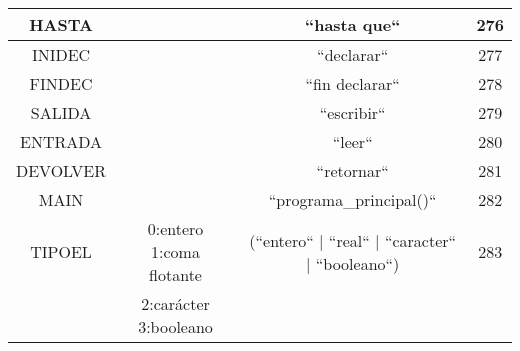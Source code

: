 \begin{table}[H]
\begin{tabular}{| c | c | c | c |}
HASTA& & ``hasta que`` & 276\\ \hline
INIDEC& & ``declarar`` & 277\\ \hline
FINDEC& & ``fin declarar`` & 278\\ \hline
SALIDA & & ``escribir`` & 279\\ \hline
ENTRADA & & ``leer`` & 280\\ \hline
DEVOLVER & & ``retornar`` & 281\\ \hline
MAIN & & ``programa\_principal()`` & 282\\ \hline
TIPOEL & 0:entero 1:coma flotante  & (``entero`` | ``real`` | ``caracter`` | ``booleano``) & 283\\
& 2:carácter 3:booleano& & \\ \hline

\end{tabular}
\end{table}

